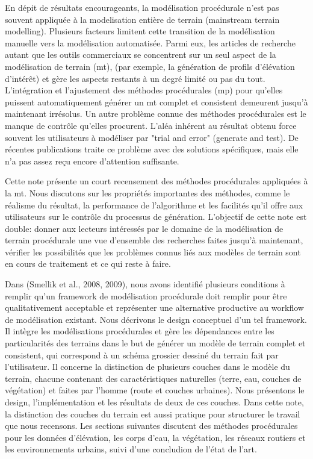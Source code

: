 \documentclass[11pt]{report}
\begin{document}
En dépit de résultats encourageants, la modélisation procédurale n'est pas souvent appliquée à la modelisation entière de terrain (mainstream terrain modelling). Plusieurs facteurs limitent cette transition de la modélisation manuelle vers la modélisation automatisée. Parmi  eux, les articles de recherche autant que les outils commerciaux se concentrent sur un seul aspect de la modélisation de terrain (mt), (par exemple, la génération de profils d'élévation d'intérêt) et gère les aspects restants à un degré limité ou pas du tout. L'intégration et l'ajustement des méthodes procédurales (mp) pour qu'elles puissent automatiquement générer un mt complet et consistent demeurent jusqu'à maintenant irrésolus. Un autre problème connue des méthodes procédurales est le manque de contrôle qu'elles procurent. L'aléa inhérent au résultat obtenu force souvent les utilisateurs à modéliser par "trial and error" (generate and test). De récentes publications traite ce problème avec des solutions spécifiques, mais elle n'a pas assez reçu encore d'attention suffisante. \newline

Cette note présente un court recensement des méthodes procédurales appliquées à la mt. Nous discutons sur les propriétés importantes des méthodes, comme le réalisme du résultat, la performance de l'algorithme et les facilités qu'il offre aux utilisateurs sur le contrôle du processus de génération. L'objectif de cette note est double: donner aux lecteurs intéressés par le domaine de la modélisation de terrain procédurale une vue d'ensemble des recherches faites jusqu'à maintenant, vérifier les possibilités que les problèmes connus liés aux modèles de terrain sont en cours de traitement et ce qui reste à faire. \newline

Dans (Smellik et al., 2008, 2009), nous avons identifié plusieurs conditions à remplir qu'un framework de modélisation procédurale doit remplir pour être qualitativement acceptable et représenter une alternative productive au workflow de modélisation existant. Nous décrivons le design conceptuel d'un tel framework. Il intègre les modélisations procédurales et gère les dépendances entre les particularités des terrains dans le but de générer un modèle de terrain complet et consistent, qui correspond à un schéma grossier dessiné du terrain fait par l'utilisateur. Il concerne la distinction de plusieurs couches dans le modèle du terrain, chacune contenant des caractéristiques naturelles (terre, eau, couches de végétation) et faites par l'homme (route et couches urbaines). Nous présentons le design, l'implémentation et les résultats de deux de ces couches. Dans cette note, la distinction des couches du terrain est aussi pratique pour  structurer le travail que nous recensons.
Les sections suivantes discutent des méthodes procédurales pour les données d'élévation, les corps d'eau, la végétation, les réseaux routiers et les environnements urbains, suivi d'une concludion de l'état de l'art.  
\end{document}
